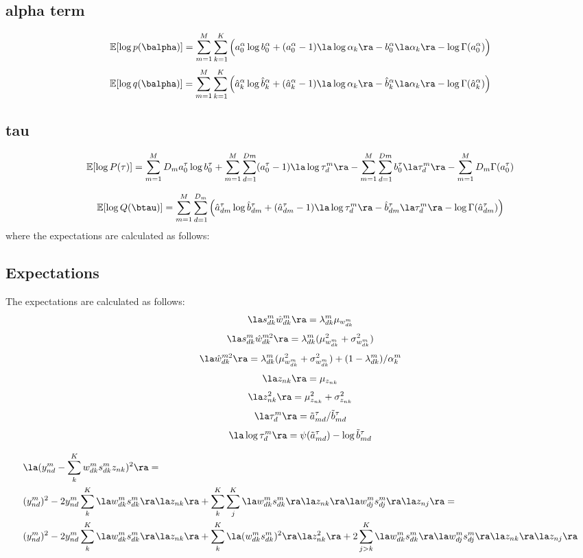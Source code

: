 \documentclass[10pt, a4paper,openany]{report}
\begin{document}
\subsection*{alpha term}
\[
\mathbb{E} [\log p(\balpha)] = \sum_{m=1}^{M}\sum_{k=1}^{K}\Big(a_0^\alpha\log b_0^\alpha +   (a_0^\alpha - 1) \la \log \alpha_k \ra - b_0^\alpha \la \alpha_k \ra - \log \Gamma(a_0^\alpha) \Big)
\]
\[
\mathbb{E} [\log q(\balpha)] = \sum_{m=1}^{M}\sum_{k=1}^{K} \Big( \hat{a}_{k}^\alpha \log \hat{b}_{k}^\alpha + (\hat{a}_{k}^\alpha - 1) \la \log \alpha_k \ra - \hat{b}_{k}^\alpha \la \alpha_k \ra - \log \Gamma(\hat{a}_{k}^\alpha) \Big)
\]

\subsection*{tau}
\[
\mathbb{E} [\log P(\tau)] = \sum_{m=1}^{M} D_m a_0^\tau \log b_0^\tau + \sum_{m=1}^{M}\sum_{d=1}^{Dm} (a_0^\tau - 1) \la \log \tau_d^m \ra - \sum_{m=1}^{M}\sum_{d=1}^{Dm} b_0^\tau \la \tau_d^m \ra - \sum_{m=1}^{M} D_m \Gamma(a_0^\tau)
\]

\[
\mathbb{E} [\log Q(\btau)] = \sum_{m=1}^{M}\sum_{d=1}^{D_m} \Big( \hat{a}_{dm}^\tau \log \hat{b}_{dm}^\tau + (\hat{a}_{dm}^\tau - 1) \la \log \tau_d^m \ra - \hat{b}_{dm}^\tau \la \tau_d^m \ra - \log \Gamma(\hat{a}_{dm}^\tau) \Big)
\]
where the expectations are calculated as follows:

\subsection*{Expectations}
The expectations are calculated as follows:
\[
\la s_{dk}^m \hat{w}_{dk}^m \ra = \lambda_{dk}^m \mu_{w_{dk}^m}
\]
\[
\la s_{dk}^m \hat{w}_{dk}^{m2} \ra = \lambda_{dk}^m (\mu_{w_{dk}^m}^2 + \sigma_{w_{dk}^m}^2)
\]
\[
\la \hat{w}_{dk}^{m2} \ra = \lambda_{dk}^m(\mu_{w_{dk}^m}^2 + \sigma_{w_{dk}^m}^2) + (1-\lambda_{dk}^m)/\alpha_k^m
\]
\[
\la z_{nk} \ra = \mu_{z_{nk}}
\]
\[
\la z_{nk}^2 \ra = \mu_{z_{nk}}^2 + \sigma_{z_{nk}}^2
\]
\[
\la \tau_d^m \ra = \tilde{a}_{md}^\tau / \tilde{b}_{md}^\tau
\]
\[
\la \log \tau_d^m \ra = \psi(\tilde{a}_{md}^\tau) - \log \tilde{b}_{md}^\tau
\]

\begin{align*}
& \la (y_{nd}^m - \sum_k^{K} w_{dk}^m s_{dk}^m z_{nk})^2 \ra = \\
&(y_{nd}^m)^2 - 2y_{nd}^m \sum_k^{K} \la w_{dk}^m s_{dk}^m \ra \la z_{nk} \ra + \sum_k^{K}\sum_j^{K} \la w_{dk}^m s_{dk}^m \ra \la z_{nk} \ra \la w_{dj}^m s_{dj}^m \ra \la z_{nj} \ra = \\
&(y_{nd}^m)^2 - 2y_{nd}^m \sum_k^{K} \la w_{dk}^m s_{dk}^m \ra \la z_{nk} \ra + \sum_k^{K} \la (w_{dk}^m s_{dk}^m)^2 \ra \la z_{nk}^2 \ra + 2\sum_{j > k}^{K} \la w_{dk}^m s_{dk}^m \ra \la w_{dj}^m s_{dj}^m \ra \la z_{nk} \ra \la z_{nj} \ra
\end{align*}
\end{document}
